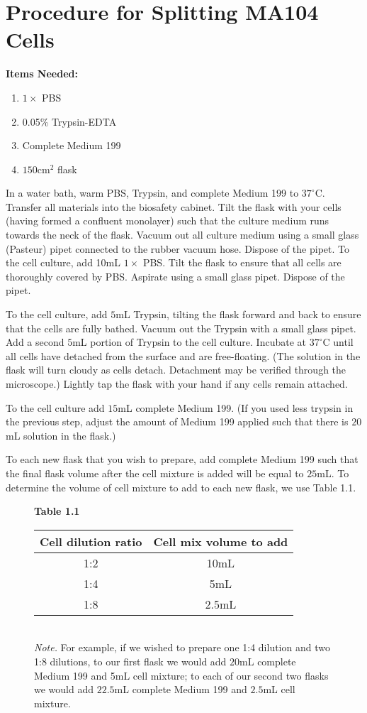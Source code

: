 \section{Procedure for Splitting MA104 Cells}

{\bfseries Items Needed:} \begin{enumerate}
	\item $1\times$ PBS
	\item 0.05\% Trypsin-EDTA
	\item Complete Medium 199
	\item $150$cm$^2$ flask
\end{enumerate}

In a water bath, warm PBS, Trypsin, and complete Medium 199 to $37^{\circ}$C. Transfer all materials into the biosafety cabinet. Tilt the flask with your cells (having formed a confluent monolayer) such that the culture medium runs towards the neck of the flask. Vacuum out all culture medium using a small glass (Pasteur) pipet connected to the rubber vacuum hose. Dispose of the pipet. To the cell culture, add 10mL $1\times$ PBS. Tilt the flask to ensure that all cells are thoroughly covered by PBS. Aspirate using a small glass pipet. Dispose of the pipet.

To the cell culture, add $5$mL Trypsin, tilting the flask forward and back to ensure that the cells are fully bathed. Vacuum out the Trypsin with a small glass pipet. Add a second $5$mL portion of Trypsin to the cell culture. Incubate at $37^{\circ}$C until all cells have detached from the surface and are free-floating. (The solution in the flask will turn cloudy as cells detach. Detachment may be verified through the microscope.) Lightly tap the flask with your hand if any cells remain attached.

To the cell culture add $15$mL complete Medium 199. (If you used less trypsin in the previous step, adjust the amount of Medium 199 applied such that there is $20$mL solution in the flask.)

To each new flask that you wish to prepare, add complete Medium 199 such that the final flask volume after the cell mixture is added will be equal to $25$mL. To determine the volume of cell mixture to add to each new flask, we use Table 1.1.

\begin{figure}[htp]
{\bfseries Table 1.1}\\[0.1cm]
\begin{tabular*}{\textwidth}{c c}
\hline
Cell dilution ratio & Cell mix volume to add \\
\hline
1:2 & 10mL \\
1:4 & 5mL \\
1:8 & 2.5mL \\
\hline
\end{tabular*}\\[0.1cm]
{\small {\itshape Note.} For example, if we wished to prepare one 1:4 dilution and two 1:8 dilutions, to our first flask we would add $20$mL complete Medium 199 and 5mL cell mixture; to each of our second two flasks we would add $22.5$mL complete Medium 199 and $2.5$mL cell mixture.}
\end{figure}

